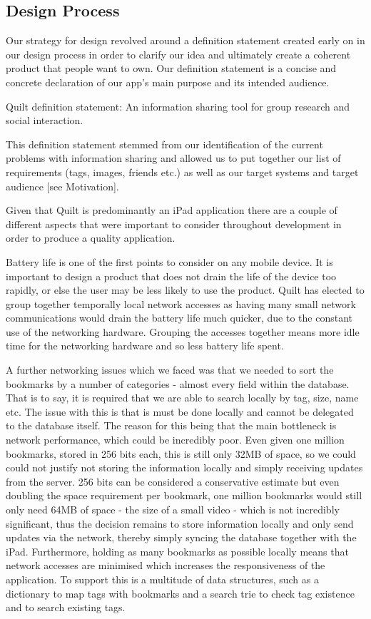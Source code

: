 \documentclass[a4wide, 10pt]{article}
\begin{document}
\subsection{Design Process}

Our strategy for design revolved around a definition statement created early on in our design process in order to clarify our idea and ultimately create a coherent product that people want to own. Our definition statement is a concise and concrete declaration of our app's main purpose and its intended audience.

Quilt definition statement: An information sharing tool for group research and social interaction.

This definition statement stemmed from our identification of the current problems with information sharing and allowed us to put together our list of requirements (tags, images, friends etc.) as well as our target systems and target audience [see Motivation].

Given that Quilt is predominantly an iPad application there are a couple of different aspects that were important to consider throughout development in order to produce a quality application.

Battery life is one of the first points to consider on any mobile device. It is important to design a product that does not drain the life of the device too rapidly, or else the user may be less likely to use the product. Quilt has elected to group together temporally local network accesses as having many small network communications would drain the battery life much quicker, due to the constant use of the networking hardware. Grouping the accesses together means more idle time for the networking hardware and so less battery life spent. 

A further networking issues which we faced was that we needed to sort the bookmarks by a number of categories - almost every field within the database. That is to say, it is required that we are able to search locally by tag, size, name etc. The issue with this is that is must be done locally and cannot be delegated to the database itself. The reason for this being that the main bottleneck is network performance, which could be incredibly poor. Even given one million bookmarks, stored in 256 bits each, this is still only 32MB of space, so we could could not justify not storing the information locally and simply receiving updates from the server. 256 bits can be considered a conservative estimate but even doubling the space requirement per bookmark, one million bookmarks would still only need 64MB of space - the size of a small video - which is not incredibly significant, thus the decision remains to store information locally and only send updates via the network, thereby simply syncing the database together with the iPad. Furthermore, holding as many bookmarks as possible locally means that  network accesses are minimised which increases the responsiveness of the application. To support this is a multitude of data structures, such as a dictionary to map tags with bookmarks and a search trie to check tag existence and to search existing tags.
\end{document}
